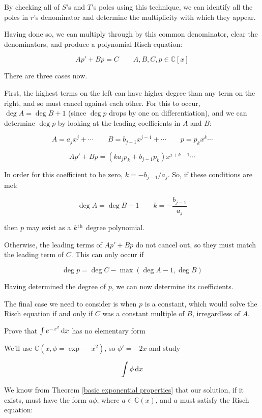 By checking all of $S$'s and $T$'s poles using this technique, we can
identify all the poles in $r$'s denominator and determine the
multiplicity with which they appear.

Having done so, we can multiply through by this common denominator,
clear the denominators, and produce a polynomial Risch equation:

$$A p' + B p = C \qquad A,B,C,p \in {\mathbb C}[x]$$

There are three cases now.

First, the highest terms on the left can have higher degree than any term on
the right, and so must cancel against each other.  For this to occur,
$\deg A = \deg B + 1$ (since $\deg p$ drops by one on differentiation),
and we can determine $\deg p$ by looking at the leading
coefficients in $A$ and $B$:

$$A = a_j x^j + \cdots \qquad B = b_{j-1} x^{j-1} + \cdots \qquad p = p_k x^k \cdots$$

$$A p' + B p = (k a_j p_k + b_{j-1} p_k) x^{j+k-1} \cdots$$

In order for this coefficient to be zero, $k=-b_{j-1}/a_j$.
So, if these conditions are met:

$$\deg A = \deg B + 1 \qquad k=-\frac{b_{j-1}}{a_j} $$

then $p$ may exist as a $k^{\rm th}$ degree polynomial.

Otherwise, the leading terms of $A p' + B p$ do not cancel out,
so they must match the leading term of $C$.  This can only
occur if

$$\deg p = \deg C - \max(\deg A - 1, \deg B)$$

Having determined the degree of $p$, we can now determine its
coefficients.

The final case we need to consider is when $p$ is a constant, which
would solve the Risch equation if and only if $C$ was a constant
multiple of $B$, irregardless of $A$.

\vfill\eject

\example Prove that $\int e^{-x^2}\, {\rm d}x$ has no elementary form

We'll use ${\mathbb C}(x, \phi = \exp\, -x^2)$, so $\phi' = -2x$ and
study

$$\int \phi \, {\rm d}x$$

We know from Theorem \ref{basic exponential properties} that our
solution, if it exists, must have the form $a\phi$, where $a \in
{\mathbb C}(x)$, and $a$ must satisfy the Risch equation:

